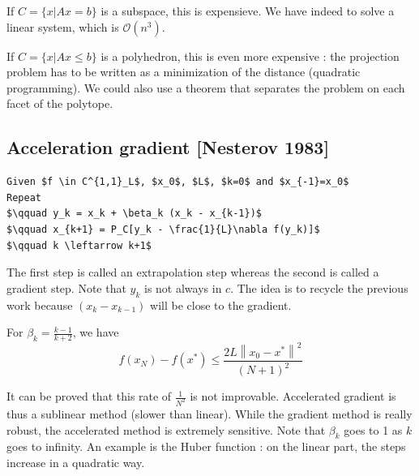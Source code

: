 \begin{example}
\begin{leftbar}
If $C=\{x|Ax=b\}$ is a subspace, this is expensieve. We have indeed to solve a linear system, which is $\mathcal{O}(n^3)$.
\end{leftbar}
\end{example}

\begin{example}
\begin{leftbar}
If $C=\{x|Ax\leq b\}$ is a polyhedron, this is even more expensive : the projection problem has to be written as a minimization of the distance (quadratic programming). We could also use a theorem that separates the problem on each facet of the polytope.
\end{leftbar}
\end{example}


\subsection{Acceleration gradient [Nesterov 1983]}


\begin{lstlisting}[mathescape,caption=Acceleration gradient]
Given $f \in C^{1,1}_L$, $x_0$, $L$, $k=0$ and $x_{-1}=x_0$
Repeat 
$\qquad y_k = x_k + \beta_k (x_k - x_{k-1})$
$\qquad x_{k+1} = P_C[y_k - \frac{1}{L}\nabla f(y_k)]$
$\qquad k \leftarrow k+1$
\end{lstlisting}

The first step is called an extrapolation step whereas the second is called a gradient step. Note that $y_k$ is not always in $c$. The idea is to recycle the previous work because $(x_k - x_{k-1})$ will be close to the gradient.

\begin{theorem}
For $\beta_k=\frac{k-1}{k+2}$, we have
\begin{equation*}
f(x_N) -  f(x^*) \leq \frac{2L\left\|x_0 - x^*\right\|^2}{(N+1)^2}
\end{equation*}
\end{theorem}

It can be proved that this rate of $\frac{1}{N^2}$ is not improvable. Accelerated gradient is thus a sublinear method (slower than linear). While the gradient method is really robust, the accelerated method is extremely sensitive. Note that $\beta_k$ goes to 1 as $k$ goes to infinity. An example is the Huber function : on the linear part, the steps increase in a quadratic way.\\

